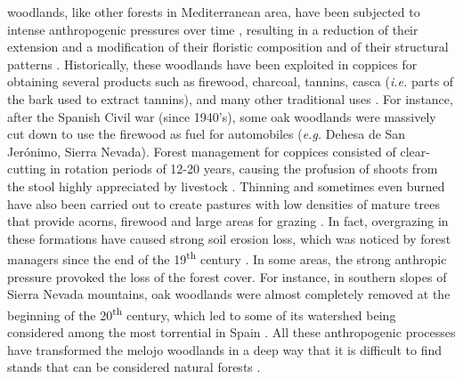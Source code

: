 \Qp woodlands, like other forests in Mediterranean area, have been subjected to intense anthropogenic pressures over time \autocite{GarciaJimenez20099230Robledales}, resulting in a reduction of their extension and a modification of their floristic composition \autocites{Serradaetal1992CoppiceSystem,Gavilanetal2000EffectsDisturbance,PerezLuqueetal2021EcologicalDiversity} and of their structural patterns \autocites{Calvoetal1999PostfireSuccession,Tarregaetal2006ForestStructure}. Historically, these woodlands have been exploited in coppices for obtaining several products such as firewood, charcoal, tannins, casca (\emph{i.e.} parts of the bark used to extract tannins), and many other traditional uses \autocites{RuizdelaTorre2006FloraMayor,SanchezPalomaresetal2008EstacionesEcologicas}. For instance, after the Spanish Civil war (since 1940's), some oak woodlands were massively cut down to use the firewood as fuel for automobiles (\emph{e.g.} Dehesa de San Jerónimo, Sierra Nevada)\autocite{Prieto1975BosquesSierra}. Forest management for coppices consisted of clear-cutting in rotation periods of 12-20 years, causing the profusion of shoots from the stool highly appreciated by livestock \autocite{Bravoetal2008SelviculturaMontes}. Thinning  and sometimes even burned have also been carried out to create pastures with low densities of mature trees that provide acorns, firewood and large areas for grazing \autocites{HerreraCalvo2016UsoPastoral,Alvarezetal2009CambiosEstructura,ValbuenaCarabanaGil2017CentenaryCoppicing}. In fact, overgrazing in these formations have caused strong soil erosion loss, which was noticed by forest managers since the end of the 19\textsuperscript{th} century \autocites{Laguna1872ComisionFlora}. In some areas, the strong anthropic pressure provoked the loss of the forest cover. For instance, in southern slopes of Sierra Nevada mountains, oak woodlands were almost completely removed at the beginning of the 20\textsuperscript{th} century, which led to some of its watershed being considered among the most torrential in Spain \autocites{RomeroZurbano1909DivisionHidrologicoforestal}. All these anthropogenic processes have transformed the melojo woodlands in a deep way that it is difficult to find stands that can be considered natural forests \autocites{RuizdelaTorre2006FloraMayor}. 

